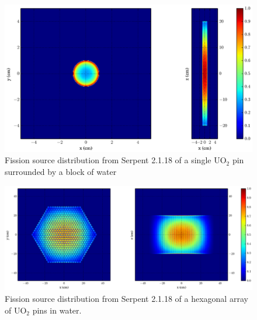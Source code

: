 \begin{figure}[h!] 
  \centering
    \includegraphics[width=\textwidth,trim= 10cm 0cm 6cm 0cm]{graphics/finalresults/pincell_fiss_serp-6.eps}
     \caption{Fission source distribution from Serpent 2.1.18 of a single UO$_2$ pin surrounded by a block of water  \label{serp_pincell_mesh} }
\end{figure}

\begin{figure}[h!] 
  \centering
    \includegraphics[width=\textwidth,trim= 4cm 0cm 6cm 0cm]{graphics/finalresults/assembly_fiss_serp-6.eps}
     \caption{Fission source distribution from Serpent 2.1.18 of a hexagonal array of UO$_2$ pins in water. \label{serp_assembly_mesh} }
\end{figure}
